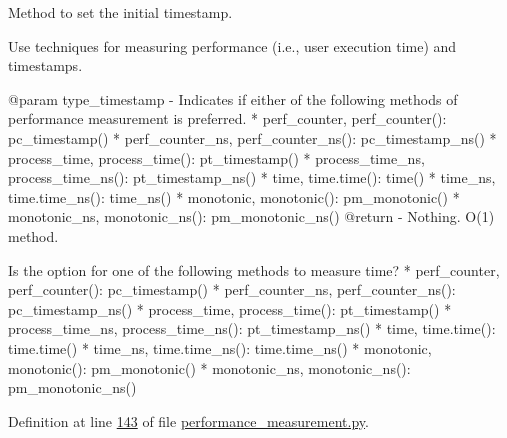 Method to set the initial timestamp. 

Use techniques for measuring performance (i.\+e., user execution time) and timestamps.

\begin{DoxyVerb}@param type_timestamp - Indicates if either of the following
            methods of performance measurement is preferred.
            * perf_counter, perf_counter(): pc_timestamp()
            * perf_counter_ns, perf_counter_ns(): pc_timestamp_ns()
            * process_time, process_time(): pt_timestamp()
            * process_time_ns, process_time_ns(): pt_timestamp_ns()
            * time, time.time(): time()
            * time_ns, time.time_ns(): time_ns()
            * monotonic, monotonic(): pm_monotonic()
            * monotonic_ns, monotonic_ns(): pm_monotonic_ns()
@return - Nothing.
O(1) method. \end{DoxyVerb}
 \begin{DoxyVerb}    Is the option for one of the following methods to measure
time?
* perf_counter, perf_counter(): pc_timestamp()
* perf_counter_ns, perf_counter_ns(): pc_timestamp_ns()
* process_time, process_time(): pt_timestamp()
* process_time_ns, process_time_ns(): pt_timestamp_ns()
* time, time.time(): time.time()
* time_ns, time.time_ns(): time.time_ns()
* monotonic, monotonic(): pm_monotonic()
* monotonic_ns, monotonic_ns(): pm_monotonic_ns()
\end{DoxyVerb}
 

Definition at line \hyperlink{performance__measurement_8py_source_l00143}{143} of file \hyperlink{performance__measurement_8py_source}{performance\+\_\+measurement.\+py}.



